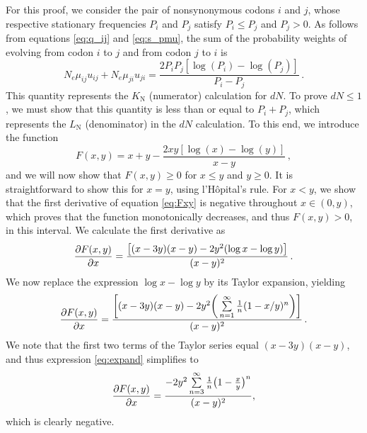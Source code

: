 \documentclass[11pt]{article}
\begin{document}
For this proof, we consider the pair of nonsynonymous codons $i$ and $j$, whose respective stationary frequencies $P_i$ and $P_j$ satisfy $P_i \leq P_j$ and $P_j > 0$. As follows from equations \eqref{eq:q_ij} and \eqref{eq:s_pmu}, the sum of the probability weights of evolving from codon $i$ to $j$ and from codon $j$ to $i$ is
\begin{equation}
N_e\mu_{ij} u_{ij} + N_e\mu_{ji} u_{ji}  = \frac{2P_iP_j[\log(P_i) - \log(P_j)]}{P_i - P_j} \,.
\end{equation}
This quantity represents the $K_\text{N}$ (numerator) calculation for $dN$. To prove $dN \leq 1$, we must show that this quantity is less than or equal to $P_i + P_j$, which represents the $L_\text{N}$ (denominator) in the $dN$ calculation. To this end, we introduce the function 
\begin{equation}\label{eq:Fxy}
F(x,y) = x + y - \frac{2xy[\log(x) - \log(y)]}{x - y} \,,
\end{equation}
and we will now show that $F(x,y) \geq 0$ for $x \leq y$ and $y \geq 0 $. It is straightforward to show this for $x=y$, using l'H\^{o}pital's rule. For $x < y$, we show that the first derivative of equation \eqref{eq:Fxy} is negative throughout $x \in (0,y)$, which proves that the function monotonically decreases, and thus $F(x,y) > 0$, in this interval. We calculate the first derivative as 
\begin{equation}
\frac{\partial{F(x,y)}}{\partial{x}} = \frac{\big{[} (x-3y)(x-y) - 2y^2(\log{x} - \log{y}) \big{]}}{(x-y)^2} \,.
\end{equation}
We now replace the expression $\log{x} - \log{y}$ by its Taylor expansion, yielding
\begin{equation}\label{eq:expand}
	\frac{\partial{F(x,y)}}{\partial{x}} = 
	\frac{ \bigg{[} (x-3y)(x-y) - 2y^2\bigg{(}\sum\limits_{n=1}^\infty \frac{1}{n} (1-x/y)^n\bigg{)} \bigg{]}}{(x-y)^2} \,.
\end{equation} We note that the first two terms of the Taylor series equal $(x-3y)(x-y)$, and thus expression \eqref{eq:expand} simplifies to 
\begin{equation}
\frac{\partial{F(x,y)}}{\partial{x}} = \frac{-2y^2\sum\limits_{n=3}^\infty \frac{1}{n} \big{(}1-\frac{x}{y}\big{)}^n}{(x-y)^2} ,
\end{equation}
which is clearly negative. 


\bigskip
\end{document}
